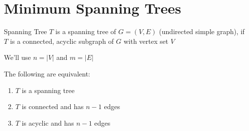 \documentclass[../../main.tex]{subfiles}
\begin{document}
\section{Minimum Spanning Trees}

\begin{definition}{Spanning Tree}{}
    $T$ is a spanning tree of $G = (V, E)$ (undirected simple graph), if $T$ is a connected, acyclic subgraph of $G$ with vertex set $V$
\end{definition}

\begin{note}
    We'll use $n = |V|$ and $m = |E|$
\end{note}

\begin{remark}
    The following are equivalent:
    \begin{enumerate}
        \item $T$ is a spanning tree
        \item $T$ is connected and has $n-1$ edges
        \item $T$ is acyclic and has $n-1$ edges
    \end{enumerate}
\end{remark}
\end{document}
